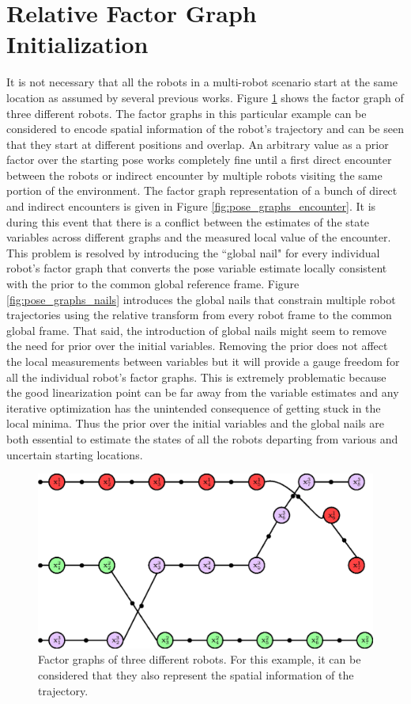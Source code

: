 \section{Relative Factor Graph Initialization} 
It is not necessary that all the robots in a multi-robot scenario start at the same location as assumed by several previous works. Figure \ref{fig:pose_graphs} shows the factor graph of three different robots. The factor graphs in this particular example can be considered to encode spatial information of the robot's trajectory and can be seen that they start at different positions and overlap. An arbitrary value as a prior factor over the starting pose works completely fine until a first direct encounter between the robots or indirect encounter by multiple robots visiting the same portion of the environment. The factor graph representation of a bunch of direct and indirect encounters is given in Figure \ref{fig:pose_graphs_encounter}. It is during this event that there is a conflict between the estimates of the state variables across different graphs and the measured local value of the encounter. This problem is resolved by introducing the ``global nail" for every individual robot's factor graph that converts the pose variable estimate locally consistent with the prior to the common global reference frame. Figure \ref{fig:pose_graphs_nails} introduces the global nails that constrain multiple robot trajectories using the relative transform from every robot frame to the common global frame. That said, the introduction of global nails might seem to remove the need for prior over the initial variables. Removing the prior does not affect the local measurements between variables but it will provide a gauge freedom for all the individual robot’s factor graphs. This is extremely problematic because the good linearization point can be far away from the variable estimates and any iterative optimization has the unintended consequence of getting stuck in the local minima. Thus the prior over the initial variables and the global nails are both essential to estimate the states of all the robots departing from various and uncertain starting locations. 
\begin{figure}
\centering
\includegraphics[width=\textwidth]{Chapters/figures4/pose_graph}
\caption{Factor graphs of three different robots. For this example, it can be considered that they also represent the spatial information of the trajectory.}
\label{fig:pose_graphs}
\end{figure}
